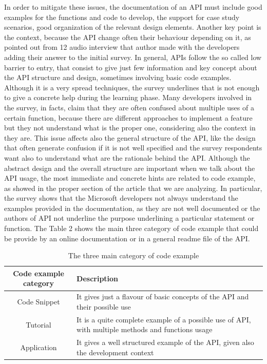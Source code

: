  In order to mitigate these issues, the documentation of an API must include good examples for the functions and code to develop, the support for case study scenarios, good organization of the relevant design elements. Another key point is the context, because the API change often their behaviour depending on it, as pointed out from 12 audio interview that author made with the developers adding their answer to the initial survey. In general, APIs follow the so called low barrier to entry, that consist to give just few information and key concept about the API structure and design, sometimes involving basic code examples. Although it is a very spread techniques, the survey underlines that is not enough to give a concrete help during the learning phase. Many developers involved in the survey, in facts, claim that they are often confused about multiple uses of a certain function, because there are different approaches to implement a feature but they not understand what is the proper one, considering also the context in they are. This issue affects also the general structure of the API, like the design that often generate confusion if it is not well specified and the survey respondents want also to understand what are the rationale behind the API.  \newline
Although the abstract design and the overall structure are important when we talk about the API usage, the most immediate and concrete hints are related to code example, as showed in the proper section of the article that we are analyzing. In particular, the survey shows that the Microsoft developers not always  understand the examples provided in the documentation, as they are not well documented or the authors of API not underline the purpose underlining a particular statement or function. The Table 2 shows the main three category of code example that could be provide by an online documentation or in a general readme file of the API. 
\begin{table}[H]

  \caption{ The three main category of code example }
  \label{Table:2}
\begin{adjustbox}{width=1\textwidth}

\begin{tabular}{|c|p{8cm}|}

\hline
 \textbf{Code example category } & \textbf{Description} \\
\hline
 Code Snippet & It gives just a flavour of basic concepts of the API and their possible use\\
\hline
Tutorial & It is a quite complete example of a possible use of API, with multiple methods and functions usage\\
\hline
Application & It gives a well structured example of the API, given also the development context \\
\hline
\end{tabular}

\end{adjustbox}
\end{table} 

